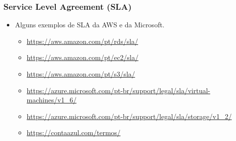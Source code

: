 \begin{frame}
	\frametitle{Service Level Agreement (SLA)}
	\begin{itemize}
		\item Alguns exemplos de SLA da AWS e da Microsoft.
		\begin{itemize}
			\item \url{https://aws.amazon.com/pt/rds/sla/}
			\item \url{https://aws.amazon.com/pt/ec2/sla/}
			\item \url{https://aws.amazon.com/pt/s3/sla/}
			\item \url{https://azure.microsoft.com/pt-br/support/legal/sla/virtual-machines/v1_6/}
			\item \url{https://azure.microsoft.com/pt-br/support/legal/sla/storage/v1_2/}
			\item \url{https://contaazul.com/termos/}
	\end{itemize}
	\end{itemize}
\end{frame}

